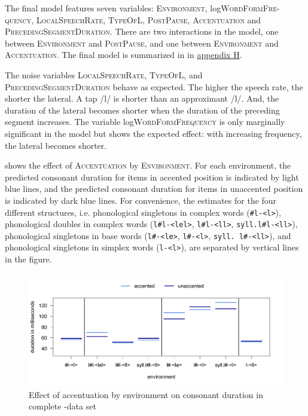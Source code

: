 The final model features seven variables: \textsc{Environment}, log\textsc{WordFormFre-quency},  \textsc{LocalSpeechRate}, \textsc{TypeOfL}, \textsc{PostPause}, \textsc{Accentuation} and \textsc{PrecedingSegmentDuration}. 
There are two interactions in the model, one between \textsc{Environment} and \textsc{PostPause}, and one between \textsc{Environment} and \textsc{Accentuation}. The final model is summarized in  in \hyperref[Appendix H: Model Summaries Experiment]{appendix H}.


The noise variables \textsc{LocalSpeechRate}, \textsc{TypeOfL}, and \textsc{PrecedingSegmentDuration} behave as expected. The higher the speech rate, the shorter the lateral. A tap /l/ is shorter than an approximant /l/. And, the duration of the lateral becomes shorter when the duration of the preceding segment increases.
The variable log\textsc{WordFormFrequency} is only marginally significant in the model but shows the expected effect: with increasing frequency, the lateral becomes shorter. 


 shows the effect of \textsc{Accentuation} by \textsc{Environment}. For each environment, the predicted consonant duration for items in accented position is indicated by light blue lines, and the predicted consonant duration for  items in unaccented position is indicated by dark blue lines.
 For convenience, the estimates for the four different structures, i.e. phonological singletons in complex words (\texttt{\#l-<l>}), phonological doubles in complex words  (\texttt{l\#l-<lel>}, \texttt{l\#l-<ll>}, \texttt{syll.l\#l-<ll>}), phonological singletons in base words (\texttt{l\#-<le>}, \texttt{l\#-<l>}, \texttt{syll. l\#-<ll>}), and phonological singletons in simplex words (\texttt{l-<l>}), are separated by vertical lines in the figure. 


\begin{figure} [h!]
	\centering

	\includegraphics [scale=0.48] {images/Experiment/LyModelCompleteInterEnvAccLines}

	\caption{Effect of accentuation by environment on consonant duration in complete -data set}
	\label{fig:Env Acc ly Complete experiment}

\end{figure}




